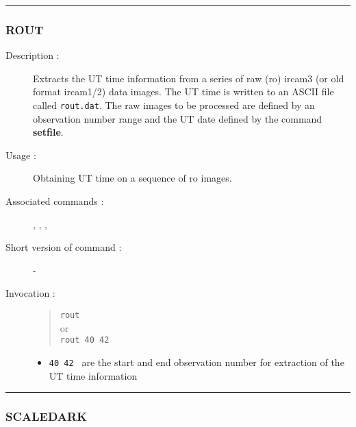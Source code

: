 \hrule 
\subsubsection*{\label{ROUT}ROUT}

\begin{description}

\item[Description :] Extracts the UT time information from a series of
raw ({\sc ro}) {\sc ircam3} (or old format {\sc ircam1/2}) data images.
The UT time is written to an ASCII file called {\tt rout.dat}.  The raw 
images to be processed are defined by an observation number range and 
the UT date defined by the command {\bf setfile}.

\item[Usage :] Obtaining UT time on a sequence of {\sc ro} images.

\item[Associated commands :] {\tt {}}, 
{\tt {}}, {\tt {}}, 
{\tt {}}

\item[Short version of command :] -
\item[Invocation :]

\begin{quote}{\tt  rout }\\
or \\
{\tt rout 40 42 }
\end{quote}

\begin{itemize}

\item {\tt 40 42 } are the start and end observation number for
 extraction of the UT time information
\end{itemize}

\end{description}

\hrule 
\subsubsection*{\label{SCALEDARK}SCALEDARK}

